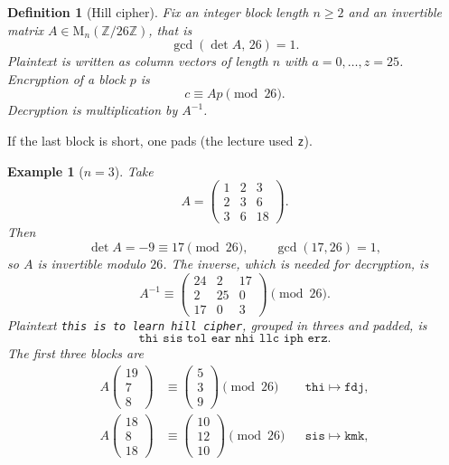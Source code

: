 \documentclass[11pt]{article}
\newtheorem{definition}[theorem]{Definition}
\newtheorem{example}[theorem]{Example}
\theoremstyle{remark}
\DeclareMathOperator{\gcdop}{gcd}
\newcommand{\Z}{\mathbb Z}
\begin{document}
\begin{definition}[Hill cipher]
Fix an integer block length $n\ge 2$ and an invertible matrix
$A\in\mathrm{M}_n(\Z/26\Z)$, that is
\[
    \gcdop(\det A,\,26)=1.
\]
Plaintext is written as column vectors of length $n$ with $a=0,\ldots,z=25$.
Encryption of a block $p$ is
\[
    c \equiv A p \pmod{26}.
\]
Decryption is multiplication by $A^{-1}$.
\end{definition}

If the last block is short, one pads (the lecture used \texttt{z}).

\begin{example}[$n=3$]
Take
\[
    A
    =
    \begin{pmatrix}
    1 & 2 & 3 \\
    2 & 3 & 6 \\
    3 & 6 & 18
    \end{pmatrix}.
\]
Then
\[
    \det A = -9 \equiv 17 \pmod{26},
    \qquad
    \gcdop(17,26)=1,
\]
so $A$ is invertible modulo $26$. The inverse, which is needed for
decryption, is
\[
    A^{-1}
    \equiv
    \begin{pmatrix}
    24 & 2 & 17 \\
    2 & 25 & 0 \\
    17 & 0 & 3
    \end{pmatrix}
    \pmod{26}.
\]
Plaintext \texttt{this is to learn hill cipher}, grouped in threes and
padded, is
\[
    \texttt{thi sis tol ear nhi llc iph erz}.
\]
The first three blocks are
\begin{align*}
    A
    \begin{pmatrix} 19 \\ 7 \\ 8 \end{pmatrix}
    &\equiv
    \begin{pmatrix} 5 \\ 3 \\ 9 \end{pmatrix}
    \pmod{26}
    &&\texttt{thi}\mapsto\texttt{fdj},\\[4pt]
    A
    \begin{pmatrix} 18 \\ 8 \\ 18 \end{pmatrix}
    &\equiv
    \begin{pmatrix} 10 \\ 12 \\ 10 \end{pmatrix}
    \pmod{26}
    &&\texttt{sis}\mapsto\texttt{kmk},\\[4pt]

\end{align*}
\end{example}
\end{document}
